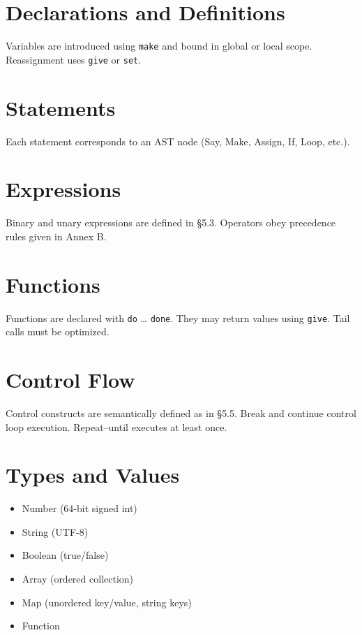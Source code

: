 \documentclass[12pt,a4paper]{article}
\begin{document}
\section{Declarations and Definitions}
Variables are introduced using \texttt{make} and bound in global or local scope. Reassignment uses \texttt{give} or \texttt{set}.

\section{Statements}
Each statement corresponds to an AST node (Say, Make, Assign, If, Loop, etc.).

\section{Expressions}
Binary and unary expressions are defined in §5.3. Operators obey precedence rules given in Annex B.

\section{Functions}
Functions are declared with \texttt{do} … \texttt{done}. They may return values using \texttt{give}. Tail calls must be optimized.

\section{Control Flow}
Control constructs are semantically defined as in §5.5. Break and continue control loop execution. Repeat–until executes at least once.

\section{Types and Values}
\begin{itemize}
\item Number (64-bit signed int)
\item String (UTF-8)
\item Boolean (true/false)
\item Array (ordered collection)
\item Map (unordered key/value, string keys)
\item Function
\end{itemize}
\end{document}
